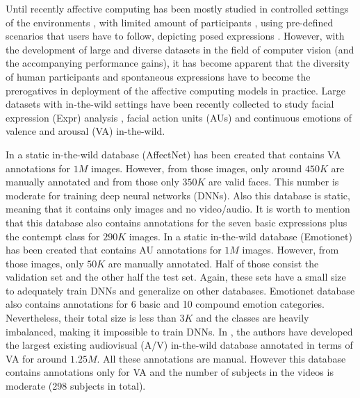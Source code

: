 \documentclass{bmvc2k}
\begin{document}
Until recently affective computing has been mostly studied in controlled settings of the environments \cite{gross2010multi,lucey2010extended,tian2001recognizing,yin20063d,yin2008high}, with limited amount of participants \cite{pantic2005web,valstar2010induced,lyons1998japanese,ringeval2013introducing,bilakhia2015mahnob}, using pre-defined scenarios that users have to follow, depicting posed expressions \cite{aifanti2010mug,mckeown2011semaine}. 
However, with the development of large and diverse datasets in the field of computer vision (and the accompanying performance gains), it has become apparent that the diversity of human participants and spontaneous expressions have to become the prerogatives in deployment of the affective computing models in practice. 
Large datasets with in-the-wild settings have been recently collected  to study facial expression (Expr) analysis \cite{dalgleish2000handbook,cowie2003describing}, facial action units (AUs) \cite{ekman2002facial} and continuous emotions of valence and arousal (VA) \cite{whissel1989dictionary,russell1978evidence} in-the-wild. 

In \cite{mollahosseini2017affectnet} a static in-the-wild database (AffectNet) has been created that contains VA annotations for $1M$ images. However, from those images, only around $450K$ are manually annotated and from those only $350K$ are valid faces. This number is moderate for training deep neural networks (DNNs). Also this database is static, meaning that it contains only images and no video/audio. It is worth to mention that this database also contains annotations for the seven basic expressions plus the contempt class for $290K$ images.
In \cite{emotionet2016} a static in-the-wild database (Emotionet) has been created that contains AU annotations for $1M$ images. However, from those images, only $50K$ are manually annotated. Half of those consist the validation set and the other half the test set. Again, these sets have a small size to adequately train DNNs and generalize on other databases. Emotionet database also contains annotations for 6 basic and 10 compound emotion categories. Nevertheless, their total size is less than $3K$ and the classes are heavily imbalanced, making it impossible to train DNNs.
In \cite{kollias2019deep,zafeiriou2017aff}, the authors have developed the largest existing audiovisual (A/V) in-the-wild database annotated in terms of VA for around $1.25M$. All these annotations are manual. However this database contains annotations only for VA and the number of subjects in the videos is moderate (298 subjects in total).
\end{document}
